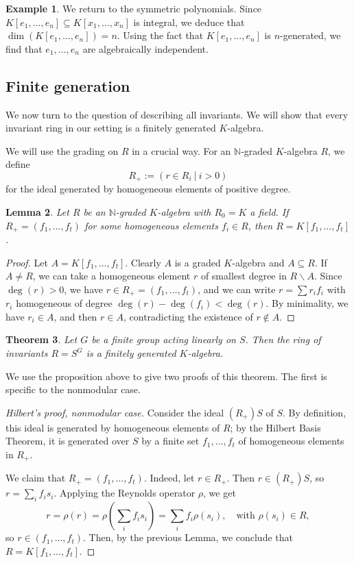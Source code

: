 \documentclass[12pt]{amsart}
\newtheorem{theorem}{Theorem}[section]
\newtheorem{lemma}[theorem]{Lemma}
\theoremstyle{definition}
\newtheorem{example}[theorem]{Example}
\numberwithin{equation}{theorem}
\def\NN{\mathbb{N}}
\begin{document}
\begin{example} We return to the symmetric polynomials. Since $K[e_1,\dots,e_n] \subseteq K[x_1,\dots,x_n]$ is integral, we deduce that $\dim(K[e_1,\dots,e_n])=n$. Using the fact that $K[e_1,\dots,e_n]$ is $n$-generated, we find that $e_1,\dots,e_n$ are algebraically independent.
\end{example}


\subsection*{Finite generation} We now turn to the question of describing all invariants. We will show that every invariant ring in our setting is a finitely generated $K$-algebra.

We will use the grading on $R$ in a crucial way. For an $\NN$-graded $K$-algebra $R$, we define
\[ R_+ := ( r \in R_i \ | \ i>0 )\]
for the ideal generated by homogeneous elements of positive degree.


\begin{lemma} Let $R$ be an $\NN$-graded $K$-algebra with $R_0=K$ a field. If $R_+=(f_1,\dots,f_t)$ for some homogeneous elements $f_i\in R$, then $R=K[f_1,\dots,f_t]$.
\end{lemma}
\begin{proof} Let $A=K[f_1,\dots,f_t]$. Clearly $A$ is a graded $K$-algebra and $A\subseteq R$. If $A\neq R$, we can take a homogeneous element $r$ of smallest degree in $R \smallsetminus A$. Since $\deg(r)>0$, we have $r\in R_+=(f_1,\dots,f_t)$, and we can write $r= \sum r_i f_i$ with $r_i$ homogeneous of degree $\deg(r) - \deg(f_i) < \deg(r)$. By minimality, we have $r_i \in A$, and then $r\in A$, contradicting the existence of $r\notin A$.
\end{proof}

\begin{theorem} Let $G$ be a finite group acting linearly on $S$. Then the ring of invariants $R=S^G$ is a finitely generated $K$-algebra.
\end{theorem}
We use the proposition above to give two proofs of this theorem. The first is specific to the nonmodular case.
\begin{proof}[Hilbert's proof, nonmodular case] Consider the ideal $(R_+)S$ of $S$. By definition, this ideal is generated by homogeneous elements of $R$; by the Hilbert Basis Theorem, it is generated over $S$ by a finite set $f_1,\dots,f_t$ of homogeneous elements in $R_+$.

We claim that $R_+ = (f_1,\dots,f_t)$. Indeed, let $r\in R_+$. Then $r \in (R_+)S$, so $r = \sum_i f_i s_i$. Applying the Reynolds operator $\rho$, we  get
\[ r= \rho(r) = \rho( \sum_i f_i s_i) = \sum_i f_i \rho(s_i), \quad \text{with $\rho(s_i)\in R$},\]
so $r\in (f_1,\dots,f_t)$. Then, by the previous Lemma, we conclude that $R=K[f_1,\dots,f_t]$.
\end{proof}
\end{document}
